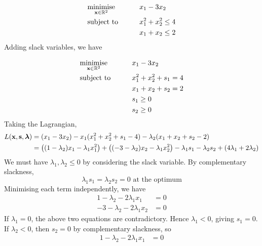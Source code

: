 \begin{example}
	\begin{alignat*}{2}
		 & \underset{\vb x \in \mathbb R^2}{\text{minimise}} & \qquad & x_1 - 3x_2           \\
		 & \text{subject to}                                 &        & x_1^2 + x_2^2 \leq 4 \\
		 &                                                   &        & x_1 + x_2 \leq 2
	\end{alignat*}
	Adding slack variables, we have

	\begin{alignat*}{2}
		 & \underset{\vb x \in \mathbb R^2}{\text{minimise}} & \qquad & x_1 - 3x_2              \\
		 & \text{subject to}                                 &        & x_1^2 + x_2^2 + s_1 = 4 \\
		 &                                                   &        & x_1 + x_2 + s_2 = 2     \\
		 &                                                   &        & s_1 \geq 0              \\
		 &                                                   &        & s_2 \geq 0
	\end{alignat*}
	Taking the Lagrangian,
	\begin{align*}
		L(\vb x, \vb s, \bm \lambda) & = (x_1 - 3x_2) - x_1(x_1^2 + x_2^2 + s_1 - 4) - \lambda_2(x_1 + x_2 + s_2 - 2)                                                                       \\
		                             & = \qty((1 - \lambda_2)x_1 - \lambda_1 x_1^2) + \qty((-3-\lambda_2)x_2 - \lambda_1 x_2^2) - \lambda_1 s_1 - \lambda_2 s_2 + (4\lambda_1 + 2\lambda_2)
	\end{align*}
	We must have \(\lambda_1, \lambda_2 \leq 0\) by considering the slack variable.
	By complementary slackness,
	\[
		\lambda_1 s_1 = \lambda_2 s_2 = 0 \text{ at the optimum}
	\]
	Minimising each term independently, we have
	\begin{align*}
		1 - \lambda_2 - 2\lambda_1 x_1 & = 0 \\
		-3-\lambda_2 - 2\lambda_1 x_2  & = 0
	\end{align*}
	If \(\lambda_1 = 0\), the above two equations are contradictory.
	Hence \(\lambda_1 < 0\), giving \(s_1 = 0\).
	If \(\lambda_2 < 0\), then \(s_2 = 0\) by complementary slackness, so
	\begin{align*}
		1 - \lambda_2 - 2\lambda_1 x_1 & = 0 \\

\end{align*}
\end{example}
